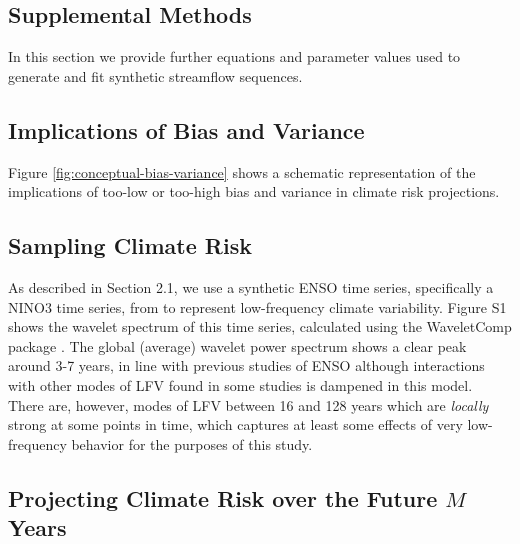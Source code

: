 \documentclass[
      draft,
      ef,
]{agutexSI2019}
\begin{document}
\begin{article}

\renewcommand{\thefigure}{S\arabic{figure}}
\setcounter{figure}{0}
\renewcommand{\theequation}{S\arabic{equation}}
\setcounter{equation}{0}
\renewcommand{\thetable}{S\arabic{table}}
\setcounter{table}{0}

\section{Supplemental Methods}\label{sec:supp-methods}

In this section we provide further equations and parameter values used to generate and fit synthetic streamflow sequences.

\subsection{Implications of Bias and Variance}

Figure \ref{fig:conceptual-bias-variance} shows a schematic representation of the implications of too-low or too-high bias and variance in climate risk projections.

\subsection{Sampling Climate Risk}\label{sec:supp-nino-spectrum}

As described in Section 2.1, we use a synthetic ENSO time series, specifically a NINO3 time series, from \cite{Ramesh:2016hf} to represent low-frequency climate variability.
Figure S1 shows the wavelet spectrum of this time series, calculated using the WaveletComp package \cite{Roesch:wlBQQoIs}.
The global (average) wavelet power spectrum shows a clear peak around 3-7 years, in line with previous studies of ENSO although interactions with other modes of LFV found in some studies \cite{Jin:1994wq} is dampened in this model.
There are, however, modes of LFV between 16 and 128 years which are \emph{locally} strong at some points in time, which captures at least some effects of very low-frequency behavior for the purposes of this study.

\subsection{Projecting Climate Risk over the Future $M$ Years}


\end{article}
\end{document}
